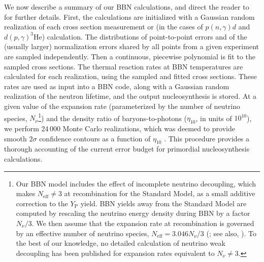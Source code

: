 \documentclass[12pt,preprint,useAMS,usenatbib]{emulateapj}
\begin{document}
We now describe a summary of our BBN calculations, and
direct the reader to \citet{NolBur00} for further
details. First, the calculations are initialized with a Gaussian
random realization of each cross section measurement or (in the cases
of $p(n,\gamma)d$ and $d(p,\gamma)^3\mathrm{He}$) calculation.  The
distributions of point-to-point errors and of the (usually larger)
normalization errors shared by all points from a given experiment are
sampled independently.  Then a continuous, piecewise polynomial is fit
to the sampled cross sections. The thermal reaction rates at BBN
temperatures are calculated for each realization, using the sampled
and fitted cross sections. These rates are used as input into a BBN
code, along with a Gaussian random realization of the neutron
lifetime, and the output nucleosynthesis is stored.
At a given value of the expansion rate (parameterized by the
number of neutrino species, $N_{\nu}$\footnote{Our BBN model
includes the effect of incomplete neutrino decoupling, which
makes $N_\mathrm{eff} \neq 3$ at recombination for the
Standard Model, as a small additive correction to the $Y_\mathrm{P}$ yield.
BBN yields away from the Standard Model are computed by rescaling the
neutrino energy density during BBN by a factor $N_\nu/3$. We then assume that
the expansion rate at recombination is governed by an effective number of neutrino
species, $N_\mathrm{eff} = 3.046 N_\nu /3$ (\citealt{Man05}; see also, \citealt{Gro15}).
To the best of our knowledge, no detailed calculation of neutrino
weak decoupling has been published for expansion rates equivalent to
$N_\nu \neq 3$.}) and the density ratio
of baryons-to-photons ($\eta_{10}$, in units of $10^{10}$), we
perform 24\,000 Monte Carlo realizations, which was deemed to
provide smooth $2\sigma$ confidence contours as a function of
$\eta_{10}$ \citep[see][]{NolBur00}. This procedure provides a
thorough accounting of the current error budget for primordial
nucleosynthesis calculations.
\end{document}
